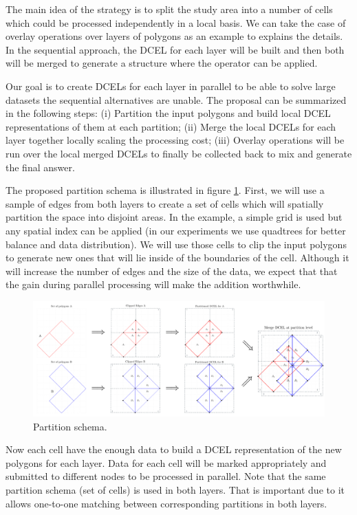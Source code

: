 The main idea of the strategy is to split the study area into a number of cells which could be processed independently in a local basis. We can take the case of overlay operations over layers of polygons as an example to explains the details. In the sequential approach, the DCEL for each layer will be built and then both will be merged to generate a structure where the operator can be applied.  

Our goal is to create DCELs for each layer in parallel to be able to solve large datasets the sequential alternatives are unable.  The proposal can be summarized in the following steps: (i) Partition the input polygons and build local DCEL representations of them at each partition; (ii) Merge the local DCELs for each layer together locally scaling the processing cost; (iii) Overlay operations will be run over the local merged DCELs to finally be collected back to mix and generate the final answer.  

The proposed partition schema is illustrated in figure \ref{fig:overlay_parted}.  First, we will use a sample of edges from both layers to create a set of cells which will spatially partition the space into disjoint areas.  In the example, a simple grid is used but any spatial index can be applied (in our experiments we use quadtrees for better balance and data distribution).  We will use those cells to clip the input polygons to generate new ones that will lie inside of the boundaries of the cell.  Although it will increase the number of edges and the size of the data, we expect that that the gain during parallel processing will make the addition worthwhile.

\begin{figure}[!ht]
    \centering
    \includegraphics[width=\textwidth]{figures/01-OverlayParted}
    \caption{Partition schema.}\label{fig:overlay_parted}
\end{figure}

Now each cell have the enough data to build a DCEL representation of the new polygons for each layer.  Data for each cell will be marked appropriately and submitted to different nodes to be processed in parallel.  Note that the same partition schema (set of cells) is used in both layers.  That is important due to it allows one-to-one matching between corresponding partitions in both layers.

